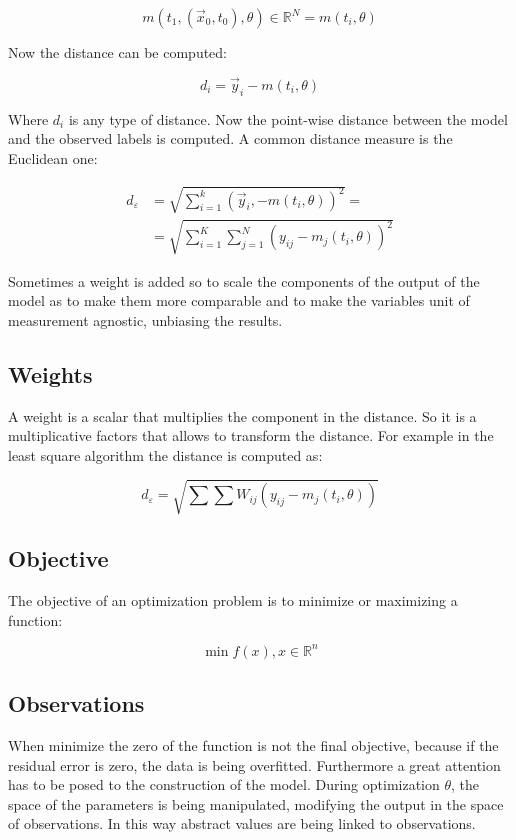   $$m\left(t_1,\left(\vec{x}_0, t_0\right), \theta\right) \in \mathbb{R}^{N} = m(t_i,\theta)$$

  Now the distance can be computed:

  $$d_i=\vec{y}_i-m(t_i, \theta)$$

  Where $d_i$ is any type of distance.
  Now the point-wise distance between the model and the observed labels is computed.
  A common distance measure is the Euclidean one:

  \begin{align*}
    d_\varepsilon &=\sqrt{\sum_{i=1}^k(\vec{y}_i,-m(t_i, \theta))^2}=\\
                  &=\sqrt{\sum_{i=1}^{K} \sum_{j=1}^{N} \left(y_{ij}-m_j\left(t_i, \theta\right)\right)^2}
  \end{align*}

  Sometimes a weight is added so to scale the components of the output of the model as to make them more comparable and to make the variables unit of measurement agnostic, unbiasing the results.

  \subsection{Weights}
  A weight is a scalar that multiplies the component in the distance.
  So it is a multiplicative factors that allows to transform the distance.
  For example in the least square algorithm the distance is computed as:

  $$d_\varepsilon=\sqrt{\sum \sum W_{ij}\left(y_{ij}-m_j\left(t_i, \theta\right)\right)}$$

  \subsection{Objective}
  The objective of an optimization problem is to minimize or maximizing a function:

  $$\min f(x), x \in \mathbb{R}^n$$

  \subsection{Observations}
  When minimize the zero of the function is not the final objective, because if the residual error is zero, the data is being overfitted.
  Furthermore a great attention has to be posed to the construction of the model.
  During optimization $\theta$, the space of the parameters is being manipulated, modifying the output in the space of observations.
  In this way abstract values are being linked to observations.


